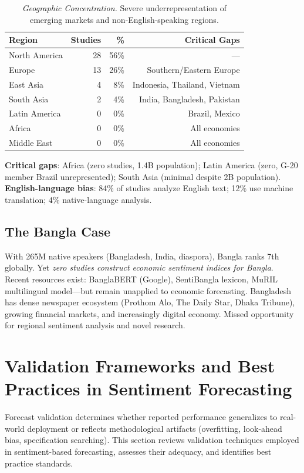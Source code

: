 \documentclass[11pt]{article}
\begin{document}
\begin{table}[H]
\centering \small
\begin{tabular}{lrrr}
\toprule
\textbf{Region} & \textbf{Studies} & \textbf{\%} & \textbf{Critical Gaps} \\
\midrule
North America & 28 & 56\% & — \\
Europe & 13 & 26\% & Southern/Eastern Europe \\
East Asia & 4 & 8\% & Indonesia, Thailand, Vietnam \\
South Asia & 2 & 4\% & India, Bangladesh, Pakistan \\
Latin America & 0 & 0\% & Brazil, Mexico \\
Africa & 0 & 0\% & All economies \\
Middle East & 0 & 0\% & All economies \\
\bottomrule
\end{tabular}
\caption{\textit{Geographic Concentration.} Severe underrepresentation of emerging markets and non-English-speaking regions.}
\end{table}

\textbf{Critical gaps}: Africa (zero studies, 1.4B population); Latin America (zero, G-20 member Brazil unrepresented); South Asia (minimal despite 2B population). \textbf{English-language bias}: 84\% of studies analyze English text; 12\% use machine translation; 4\% native-language analysis.

\subsection{The Bangla Case}

With 265M native speakers (Bangladesh, India, diaspora), Bangla ranks 7th globally. Yet \textit{zero studies construct economic sentiment indices for Bangla}. Recent resources exist: BanglaBERT (Google), SentiBangla lexicon, MuRIL multilingual model—but remain unapplied to economic forecasting. Bangladesh has dense newspaper ecosystem (Prothom Alo, The Daily Star, Dhaka Tribune), growing financial markets, and increasingly digital economy. Missed opportunity for regional sentiment analysis and novel research.

\section{Validation Frameworks and Best Practices in Sentiment Forecasting}

Forecast validation determines whether reported performance generalizes to real-world deployment or reflects methodological artifacts (overfitting, look-ahead bias, specification searching). This section reviews validation techniques employed in sentiment-based forecasting, assesses their adequacy, and identifies best practice standards.
\end{document}
